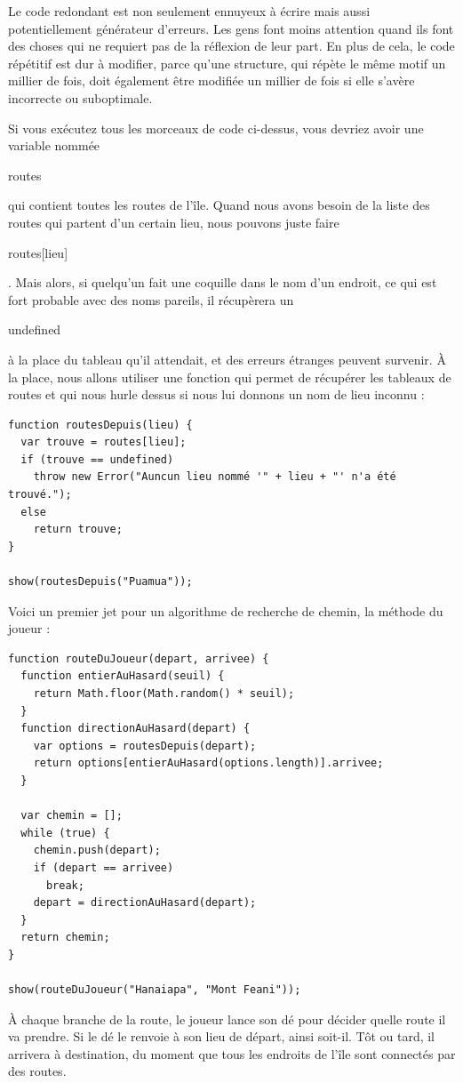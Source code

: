 \documentclass{FramateX}
\renewcommand{\texttt}[1]{\begin{sffamily}{#1}\end{sffamily}}
\begin{document}
Le code redondant est non seulement ennuyeux à écrire mais aussi
potentiellement générateur d'erreurs. Les gens font moins attention
quand ils font des choses qui ne requiert pas de la réflexion de leur
part. En plus de cela, le code répétitif est dur à modifier, parce
qu'une structure, qui répète le même motif un millier de fois, doit
également être modifiée un millier de fois si elle s'avère incorrecte ou
suboptimale.

\begin{center}\end{center}

Si vous exécutez tous les morceaux de code ci-dessus, vous devriez avoir
une variable nommée \texttt{routes} qui contient toutes les routes de
l'île. Quand nous avons besoin de la liste des routes qui partent d'un
certain lieu, nous pouvons juste faire \texttt{routes{[}lieu{]}}. Mais
alors, si quelqu'un fait une coquille dans le nom d'un endroit, ce qui
est fort probable avec des noms pareils, il récupèrera un
\texttt{undefined} à la place du tableau qu'il attendait, et des erreurs
étranges peuvent survenir. À la place, nous allons utiliser une fonction
qui permet de récupérer les tableaux de routes et qui nous hurle dessus
si nous lui donnons un nom de lieu inconnu :

\begin{lstlisting}
function routesDepuis(lieu) {
  var trouve = routes[lieu];
  if (trouve == undefined)
    throw new Error("Auncun lieu nommé '" + lieu + "' n'a été trouvé.");
  else
    return trouve;
}

show(routesDepuis("Puamua"));
\end{lstlisting}
\begin{center}\end{center}

Voici un premier jet pour un algorithme de recherche de chemin, la
méthode du joueur :

\begin{lstlisting}
function routeDuJoueur(depart, arrivee) {
  function entierAuHasard(seuil) {
    return Math.floor(Math.random() * seuil);
  }
  function directionAuHasard(depart) {
    var options = routesDepuis(depart);
    return options[entierAuHasard(options.length)].arrivee;
  }

  var chemin = [];
  while (true) {
    chemin.push(depart);
    if (depart == arrivee)
      break;
    depart = directionAuHasard(depart);
  }
  return chemin;
}

show(routeDuJoueur("Hanaiapa", "Mont Feani"));
\end{lstlisting}
À chaque branche de la route, le joueur lance son dé pour décider quelle
route il va prendre. Si le dé le renvoie à son lieu de départ, ainsi
soit-il. Tôt ou tard, il arrivera à destination, du moment que tous les
endroits de l'île sont connectés par des routes.
\end{document}
